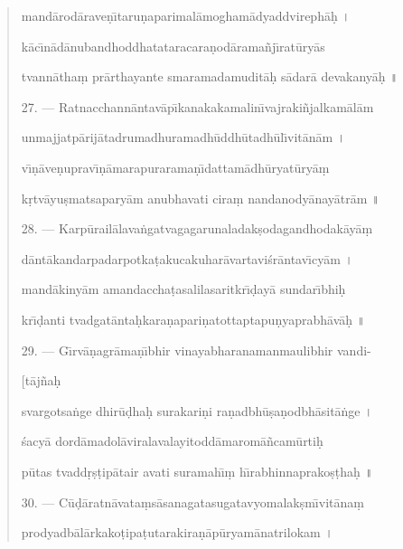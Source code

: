 \documentclass[a4paper, 11pt, oneside, french]{article}
\begin{document}
\begin{quotation}
mand\={a}rod\={a}rave\d{n}\={\i}taru\d{n}aparimal\={a}mogham\={a}dyaddvireph\={a}\d{h} \texthindi{।}

k\={a}c\={\i}n\={a}d\={a}nubandhoddhatataracara\d{n}od\={a}rama\~{n}j\={\i}rat\={u}ry\={a}s

tvann\={a}tha\d{m} pr\={a}rthayante smaramadamudit\={a}\d{h} s\={a}dar\={a} devakany\={a}\d{h} \texthindi{॥}

\bigskip

27. --- Ratnacchann\={a}ntav\={a}p\={\i}kanakakamalin\={\i}vajraki\~{n}jalkam\={a}l\={a}m

unmajjatp\={a}rij\={a}tadrumadhuramadh\={u}ddh\={u}tadh\={u}l\={\i}vit\={a}n\={a}m \texthindi{।}

v\={\i}\d{n}\={a}ve\d{n}uprav\={\i}\d{n}\={a}marapurarama\d{n}\={\i}dattam\={a}dh\={u}ryat\={u}ry\={a}\d{m}

k\d{r}tv\={a}yu\d{s}matsapary\={a}m anubhavati cira\d{m} nandanody\={a}nay\={a}tr\={a}m \texthindi{॥}

\bigskip

28. --- Karp\={u}rail\={a}lava\.{n}gatvagagarunaladak\d{s}odagandhodak\={a}y\={a}\d{m}

d\={a}nt\={a}kandarpadarpotka\d{t}akucakuhar\={a}vartavi\'{s}r\={a}ntav\={\i}cy\={a}m \texthindi{।}

mand\={a}kiny\={a}m amandaccha\d{t}asalilasaritkr\={\i}\d{d}ay\={a} sundar\={\i}bhi\d{h}

kr\={\i}\d{d}anti tvadgat\={a}nta\d{h}kara\d{n}apari\d{n}atottaptapu\d{n}yaprabh\={a}v\={a}\d{h} \texthindi{॥}

\bigskip

29. --- G\={\i}rv\={a}\d{n}agr\={a}ma\d{n}\={\i}bhir vinayabharanamanmaulibhir vandi-

\hspace*{25mm}[t\={a}j\~{n}a\d{h}

svargotsa\.{n}ge dhir\={u}\d{d}ha\d{h} surakari\d{n}i ra\d{n}adbh\={u}\d{s}a\d{n}odbh\={a}sit\={a}\.{n}ge \texthindi{।}

\'{s}acy\={a} dord\={a}madol\={a}viralavalayitodd\={a}marom\={a}\~{n}cam\={u}rti\d{h}

p\={u}tas tvadd\d{r}\d{s}\d{t}ip\={a}tair avati suramah\={\i}\d{m} h\={\i}rabhinnaprako\d{s}\d{t}ha\d{h} \texthindi{॥}

\bigskip

30. --- C\={u}\d{d}\={a}ratn\={a}vata\d{m}s\={a}sanagatasugatavyomalak\d{s}m\={\i}vit\={a}na\d{m}

prodyadb\={a}l\={a}rkako\d{t}ipa\d{t}utarakira\d{n}\={a}p\={u}ryam\={a}natrilokam \texthindi{।}


\end{quotation}
\end{document}
